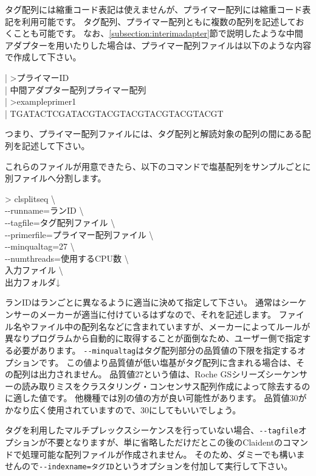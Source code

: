 \documentclass[titlepage,10pt,a4paper]{jsbook}
\newenvironment{content}{\begin{shaded}\vspace{-1em}\raggedright\ttfamily\footnotesize\setlength{\baselineskip}{1.4em}}{\end{shaded}\vspace{-1em}}
\newenvironment{cmd}{\begin{oframed}\raggedright\ttfamily\footnotesize\setlength{\baselineskip}{1.4em}}{\end{oframed}\vspace{-1em}}
\begin{document}
タグ配列には縮重コード表記は使えませんが、プライマー配列には縮重コード表記を利用可能です。
タグ配列、プライマー配列ともに複数の配列を記述しておくことも可能です。
なお、\ref{subsection:interimadapter}節で説明したような中間アダプターを用いたりした場合は、プライマー配列ファイルは以下のような内容で作成して下さい。

\begin{content}
| {\textgreater}プライマーID\\
| 中間アダプター配列プライマー配列\\
| {\textgreater}exampleprimer1\\
| TGATACTCGATACGTACGTACGTACGTACGTACGT
\end{content}

つまり、プライマー配列ファイルには、タグ配列と解読対象の配列の間にある配列を記述して下さい。

これらのファイルが用意できたら、以下のコマンドで塩基配列をサンプルごとに別ファイルへ分割します。

\begin{cmd}
{\textgreater} clsplitseq {\textbackslash}\\
{-}{-}runname=ランID {\textbackslash}\\
{-}{-}tagfile=タグ配列ファイル {\textbackslash}\\
{-}{-}primerfile=プライマー配列ファイル {\textbackslash}\\
{-}{-}minqualtag=27 {\textbackslash}\\
{-}{-}numthreads=使用するCPU数 {\textbackslash}\\
入力ファイル {\textbackslash}\\
出力フォルダ↓
\end{cmd}

ランIDはランごとに異なるように適当に決めて指定して下さい。
通常はシーケンサーのメーカーが適当に付けているはずなので、それを記述します。
ファイル名やファイル中の配列名などに含まれていますが、メーカーによってルールが異なりプログラムから自動的に取得することが面倒なため、ユーザー側で指定する必要があります。
\texttt{{-}{-}minqualtag}はタグ配列部分の品質値の下限を指定するオプションです。
この値より品質値が低い塩基がタグ配列に含まれる場合は、その配列は出力されません。
品質値27という値は、Roche GSシリーズシーケンサーの読み取りミスをクラスタリング・コンセンサス配列作成によって除去するのに適した値です\citep{Kunin2010}。
他機種では別の値の方が良い可能性があります。
品質値30がかなり広く使用されていますので、30にしてもいいでしょう。

タグを利用したマルチプレックスシーケンスを行っていない場合、\texttt{{-}{-}tagfile}オプションが不要となりますが、単に省略しただけだとこの後のClaidentのコマンドで処理可能な配列ファイルが作成されません。
そのため、ダミーでも構いませんので\texttt{{-}{-}indexname=タグID}というオプションを付加して実行して下さい。
\end{document}
